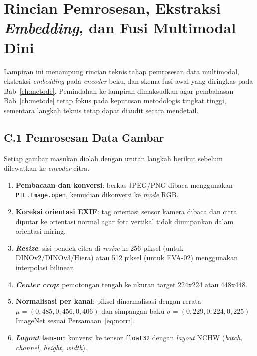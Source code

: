 \chapter{Rincian Pemrosesan, Ekstraksi \textit{Embedding}, dan Fusi Multimodal Dini}
\label{app:preprocessing-embedding}

Lampiran ini menampung rincian teknis tahap pemrosesan data multimodal, ekstraksi \textit{embedding} pada \textit{encoder} beku, dan skema fusi awal yang diringkas pada Bab~\ref{ch:metode}. Pemindahan ke lampiran dimaksudkan agar pembahasan Bab~\ref{ch:metode} tetap fokus pada keputusan metodologis tingkat tinggi, sementara langkah teknis tetap dapat diaudit secara mendetail.

\section*{C.1 Pemrosesan Data Gambar}
\label{app:img-preprocess}

Setiap gambar masukan diolah dengan urutan langkah berikut sebelum dilewatkan ke \textit{encoder} citra.

\begin{enumerate}
    \item \textbf{Pembacaan dan konversi}: berkas JPEG/PNG dibaca menggunakan \texttt{PIL.Image.open}, kemudian dikonversi ke \textit{mode} RGB.
    \item \textbf{Koreksi orientasi EXIF}: tag orientasi sensor kamera dibaca dan citra diputar ke orientasi normal agar foto vertikal tidak diumpankan dalam orientasi miring.
    \item \textbf{\textit{Resize}}: sisi pendek citra di-\textit{resize} ke 256 piksel (untuk DINOv2/DINOv3/Hiera) atau 512 piksel (untuk EVA-02) menggunakan interpolasi bilinear.
    \item \textbf{\textit{Center crop}}: pemotongan tengah ke ukuran target 224x224 atau 448x448.
    \item \textbf{Normalisasi per kanal}: piksel dinormalisasi dengan rerata $\mu = (0{,}485, 0{,}456, 0{,}406)$ dan simpangan baku $\sigma = (0{,}229, 0{,}224, 0{,}225)$ ImageNet sesuai Persamaan~\ref{eq:norm}.
    \item \textbf{\textit{Layout} tensor}: konversi ke tensor \texttt{float32} dengan \textit{layout} NCHW (\textit{batch, channel, height, width}).
\end{enumerate}

